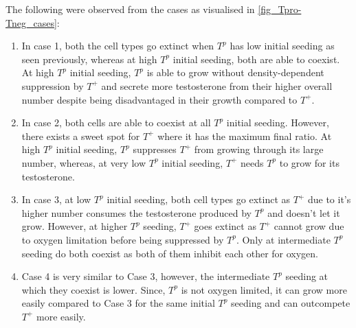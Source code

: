 \newpage
The following were observed from the cases as visualised in \autoref{fig_Tpro-Tneg_cases}:
\begin{enumerate}
  \item  In case 1, both the cell types go extinct when $T^p$ has low initial seeding as seen previously, whereas at high $T^p$ initial seeding, both are able to coexist. At high $T^p$ initial seeding, $T^p$ is able to grow without density-dependent suppression by $T^+$ and secrete more testosterone from their higher overall number despite being disadvantaged in their growth compared to $T^+$.
  \item In case 2, both cells are able to coexist at all $T^p$ initial seeding. However, there exists a sweet spot for $T^+$ where it has the maximum final ratio. At high $T^p$ initial seeding, $T^p$ suppresses $T^+$ from growing through its large number, whereas, at very low $T^p$ initial seeding, $T^+$ needs $T^p$ to grow for its testosterone.
  \item In case 3, at low $T^p$ initial seeding, both cell types go extinct as $T^+$ due to it’s higher number consumes the testosterone produced by $T^p$ and doesn’t let it grow. However, at higher $T^p$ seeding, $T^+$ goes extinct as $T^+$ cannot grow due to oxygen limitation before being suppressed by $T^p$. Only at intermediate $T^p$ seeding do both coexist as both of them inhibit each other for oxygen.
  \item Case 4 is very similar to Case 3, however, the intermediate $T^p$ seeding at which they coexist is lower.  Since, $T^p$ is not oxygen limited, it can grow more easily compared to Case 3 for the same initial $T^p$ seeding and can outcompete $T^+$ more easily.
\end{enumerate}
